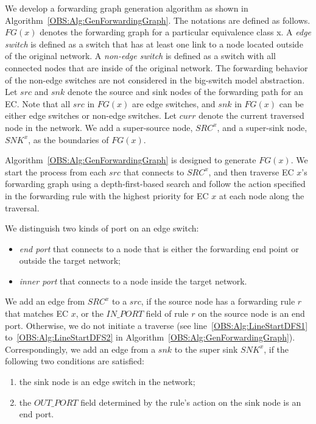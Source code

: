 We develop a forwarding graph generation algorithm as shown in Algorithm~\ref{OBS:Alg:GenForwardingGraph}.
The notations are defined as follows.
$FG(x)$ denotes the forwarding graph for a particular equivalence class x.
A \textit{edge switch} is defined as a switch that has at least one link to a node located outside of the original network. 
A \textit{non-edge switch} is defined as a switch with all connected nodes that are inside of the original network.
The forwarding behavior of the non-edge switches are not considered in the big-switch model abstraction.
Let $src$ and $snk$ denote the source and sink nodes of the forwarding path for an EC.
Note that all $src$ in $FG(x)$ are edge switches,
and $snk$ in $FG(x)$ can be either edge switches or non-edge switches.
Let $curr$ denote the current traversed node in the network.
We add a super-source node, $SRC^x$, and a super-sink node, $SNK^x$, as the boundaries of $FG(x)$.

Algorithm~\ref{OBS:Alg:GenForwardingGraph} is designed to generate $FG(x)$.
We start the process from each $src$ that connects to $SRC^x$,
and then traverse EC $x$'s forwarding graph using a depth-first-based search and
follow the action specified in the forwarding rule with the highest priority for EC $x$ at each node along the traversal.


We distinguish two kinds of port on an edge switch:
\begin{itemize}
\item \textit{end port} that connects to a node that is either the forwarding end point or outside the target network;
\item \textit{inner port} that connects to a node inside the target network.
\end{itemize}

We add an edge from $SRC^x$ to a $src$, if the source node has a forwarding rule $r$ that matches EC $x$, or the $IN\_PORT$ field of rule $r$ on the source node is an end port.
Otherwise, we do not initiate a traverse (see line~\ref{OBS:Alg:LineStartDFS1} to~\ref{OBS:Alg:LineStartDFS2} in Algorithm~\ref{OBS:Alg:GenForwardingGraph}).
Correspondingly, we add an edge from a $snk$ to the super sink $SNK^x$, if the following two conditions are satisfied:
\begin{enumerate}
\item the sink node is an edge switch in the network;
\item the $OUT\_PORT$ field determined by the rule's action on the sink node is an end port.
\end{enumerate}

